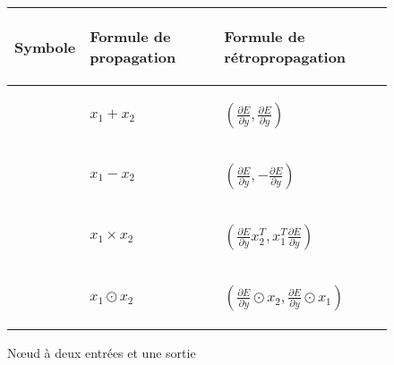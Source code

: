 \begin{figure}[h!]
\begin{center}
\begin{tabular}{|m{4cm}|m{}|m{}|}
\hline
\begin{center}Symbole\end{center} & \begin{center}Formule de propagation\end{center} & \begin{center}Formule de rétropropagation\end{center} \\
\hline
\begin{center}\end{center} & \begin{center}$x_1 + x_2$\end{center} & \begin{center}$(\frac{\partial E}{\partial y}, \frac{\partial E}{\partial y})$\end{center} \\
\hline
\begin{center}\end{center} & \begin{center}$x_1 - x_2$\end{center} & \begin{center}$(\frac{\partial E}{\partial y}, -\frac{\partial E}{\partial y})$\end{center} \\
\hline
\begin{center}\end{center} & \begin{center}$x_1 \times x_2$\end{center} & \begin{center}$(\frac{\partial E}{\partial y}x_2^T, x_1^T\frac{\partial E}{\partial y})$\end{center} \\
\hline
\begin{center}\end{center} & \begin{center}$x_1 \odot x_2$\end{center} & \begin{center}$(\frac{\partial E}{\partial y} \odot x_2, \frac{\partial E}{\partial y} \odot x_1)$\end{center} \\
\hline
\end{tabular}
\end{center}
\caption{N\oe{}ud à deux entrées et une sortie}
\end{figure}


